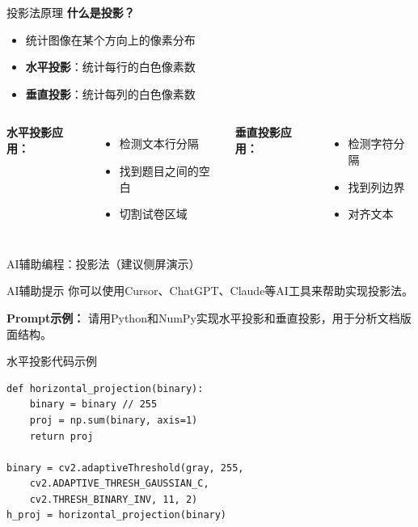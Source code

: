 \begin{frame}{投影法原理}
    \textbf{什么是投影？}
    \begin{itemize}
        \item 统计图像在某个方向上的像素分布
        \item \textbf{水平投影}：统计每行的白色像素数
        \item \textbf{垂直投影}：统计每列的白色像素数
    \end{itemize}

    \vspace{0.3cm}

    \begin{columns}
        \textbf{水平投影应用：}
        \begin{itemize}
            \item 检测文本行分隔
            \item 找到题目之间的空白
            \item 切割试卷区域
        \end{itemize}

        \textbf{垂直投影应用：}
        \begin{itemize}
            \item 检测字符分隔
            \item 找到列边界
            \item 对齐文本
        \end{itemize}
    \end{columns}
\end{frame}

\begin{frame}{AI辅助编程：投影法（建议侧屏演示）}
    \begin{block}{AI辅助提示}
        你可以使用Cursor、ChatGPT、Claude等AI工具来帮助实现投影法。

        \textbf{Prompt示例：} 请用Python和NumPy实现水平投影和垂直投影，用于分析文档版面结构。
    \end{block}
\end{frame}

\begin{frame}[fragile]{水平投影代码示例}
    \begin{lstlisting}[basicstyle=\ttfamily\scriptsize]
def horizontal_projection(binary):
    binary = binary // 255
    proj = np.sum(binary, axis=1)
    return proj

binary = cv2.adaptiveThreshold(gray, 255,
    cv2.ADAPTIVE_THRESH_GAUSSIAN_C,
    cv2.THRESH_BINARY_INV, 11, 2)
h_proj = horizontal_projection(binary)
    \end{lstlisting}

\end{frame}

